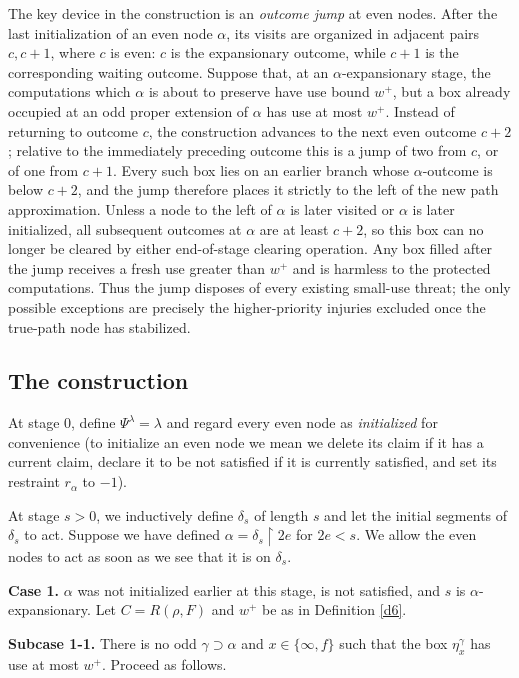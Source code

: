 \documentclass[10pt,a4paper]{amsart}
\begin{document}
The key device in the construction is an \emph{outcome jump} at even nodes.
After the last initialization of an even node $\alpha$, its visits are
organized in adjacent pairs $c,c+1$, where $c$ is even: $c$ is the
expansionary outcome, while $c+1$ is the corresponding waiting outcome.
Suppose that, at an $\alpha$-expansionary stage, the computations which
$\alpha$ is about to preserve have use bound $w^+$, but a box already
occupied at an odd proper extension of $\alpha$ has use at most $w^+$.
Instead of returning to outcome $c$, the construction advances to the next
even outcome $c+2$; relative to the immediately preceding outcome this is a
jump of two from $c$, or of one from $c+1$. Every such box lies on an earlier
branch whose $\alpha$-outcome is below $c+2$, and the jump therefore places it
strictly to the left of the new path approximation. Unless a node to the left
of $\alpha$ is later visited or $\alpha$ is later initialized, all subsequent
outcomes at $\alpha$ are at least $c+2$, so this box can no longer be cleared
by either end-of-stage clearing operation. Any box filled after the jump
receives a fresh use greater than $w^+$ and is harmless to the protected
computations. Thus the jump disposes of every existing small-use threat; the
only possible exceptions are precisely the higher-priority injuries excluded
once the true-path node has stabilized.

\subsection{The construction}
At stage $0$, define $\Psi^\lambda=\lambda$ and regard every even node as
\emph{initialized} for convenience (to
initialize an even node we mean we delete its claim if it has a current claim,
declare it to be not satisfied if it is currently satisfied, and set its restraint $r_\alpha$ to $-1$). 

At stage $s>0$, we inductively define $\delta_s$ of length $s$
and let the initial segments of $\delta_s$ to act. Suppose we have defined
$\alpha = \delta_s \upharpoonright 2 e$ for $2 e < s$. We allow the even nodes to act as soon as we see that it is on
$\delta_s$.

\textbf{Case 1.}  $\alpha$ was not initialized earlier at this stage, is not
satisfied, and $s$ is $\alpha$-expansionary.  Let 
$C=R(\rho,F)$ and $w^+$ be as in Definition \ref{d6}.

\textbf{Subcase 1-1.}  There is no odd $\gamma\supset\alpha$ and
$x\in\{\infty,f\}$ such that the box $\eta_x^\gamma$ has use at most $w^+$.
Proceed as follows.
\end{document}
